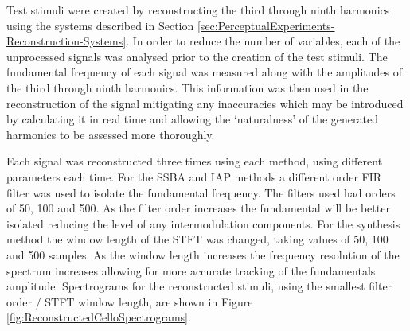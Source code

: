 			Test stimuli were created by reconstructing the third through ninth harmonics using the systems
			described in Section \ref{sec:PerceptualExperiments-Reconstruction-Systems}. In order to reduce the
			number of variables, each of the unprocessed signals was analysed prior to the creation of the test
			stimuli. The fundamental frequency of each signal was measured along with the amplitudes of the
			third through ninth harmonics. This information was then used in the reconstruction of the signal
			mitigating any inaccuracies which may be introduced by calculating it in real time and allowing the
			`naturalness' of the generated harmonics to be assessed more thoroughly.

			Each signal was reconstructed three times using each method, using different parameters each time.
			For the SSBA and IAP methods a different order FIR filter was used to isolate the fundamental
			frequency. The filters used had orders of 50, 100 and 500. As the filter order increases the
			fundamental will be better isolated reducing the level of any intermodulation components. For the
			synthesis method the window length of the STFT was changed, taking values of 50, 100 and 500
			samples. As the window length increases the frequency resolution of the spectrum increases allowing
			for more accurate tracking of the fundamentals amplitude. Spectrograms for the reconstructed
			stimuli, using the smallest filter order / STFT window length, are shown in Figure
			\ref{fig:ReconstructedCelloSpectrograms}.

